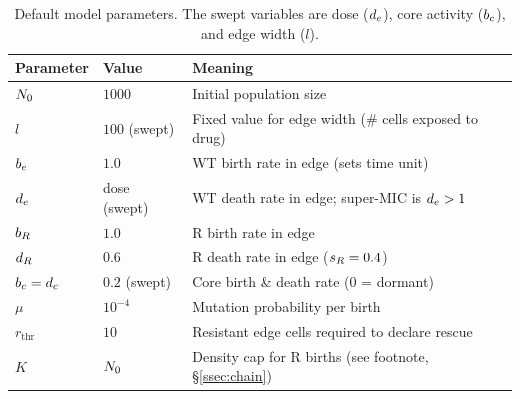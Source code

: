 \begin{table}[h!]
\centering
\small
\begin{tabular}{lll}
\toprule
Parameter & Value & Meaning \\
\midrule
$N_0$           & $1000$        & Initial population size \\
$l$                & $100$ (swept) & Fixed value for edge width (\# cells exposed to drug) \\
$b_e$           & $1.0$         & WT birth rate in edge (sets time unit) \\
$d_e$           & dose (swept)  & WT death rate in edge; super-MIC is $d_e > 1$ \\
$b_R$              & $1.0$         & R birth rate in edge \\
$d_R$              & $0.6$         & R death rate in edge ($s_R = 0.4$) \\
$b_c = d_c$  & $0.2$ (swept) & Core birth \& death rate ($0$ = dormant) \\
$\mu$              & $10^{-4}$     & Mutation probability per birth \\
$r_{\mathrm{thr}}$ & $10$          & Resistant edge cells required to declare rescue \\
$K$                & $N_0$      & Density cap for R births (see footnote, \S\ref{ssec:chain}) \\
\bottomrule
\end{tabular}
\caption{Default model parameters. The swept variables are dose ($d_e$), core activity ($b_c$), and edge width ($l$).}
\label{tab:params}
\end{table}
